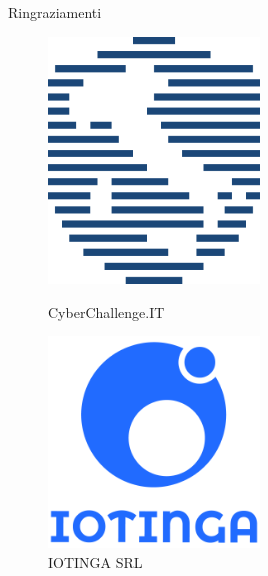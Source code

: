 \documentclass[12pt,handout]{beamer}
\begin{document}
\begin{frame}{Ringraziamenti}
    \begin{figure}[ht]
        \begin{minipage}[b]{0.45\linewidth}
            \centering
            \includegraphics[width=0.5\textwidth]{img/ccit.png}
            \caption*{CyberChallenge.IT}
            \label{fig:a}
        \end{minipage}
        \hspace{0.5cm}
        \begin{minipage}[b]{0.45\linewidth}
            \centering
            \includegraphics[width=0.5\textwidth]{img/iotinga.png}
            \caption*{IOTINGA SRL}
            \label{fig:b}
        \end{minipage}
    \end{figure}
\end{frame}
\end{document}
